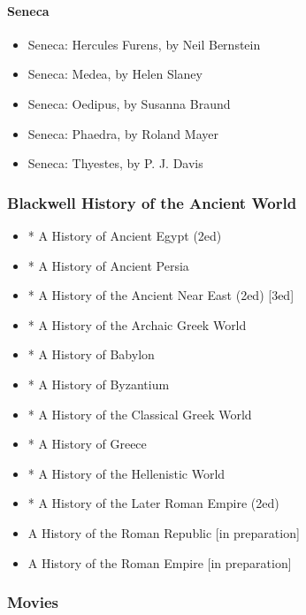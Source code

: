 \documentclass[twocolumn]{article}
\begin{document}
\paragraph{Seneca}

\begin{itemize}

\item Seneca: Hercules Furens, by Neil Bernstein
\item Seneca: Medea, by Helen Slaney
\item Seneca: Oedipus, by Susanna Braund
\item Seneca: Phaedra, by Roland Mayer
\item Seneca: Thyestes, by P. J. Davis

\end{itemize}

\subsubsection{Blackwell History of the Ancient World}

\begin{itemize}

\item * A History of Ancient Egypt (2ed)
\item * A History of Ancient Persia
\item * A History of the Ancient Near East (2ed) [3ed]
\item * A History of the Archaic Greek World
\item * A History of Babylon
\item * A History of Byzantium
\item * A History of the Classical Greek World
\item * A History of Greece
\item * A History of the Hellenistic World
\item * A History of the Later Roman Empire (2ed)

\bigskip

\item A History of the Roman Republic [in preparation]
\item A History of the Roman Empire [in preparation]

\end{itemize}

\newpage

\subsubsection{Movies}
\end{document}

